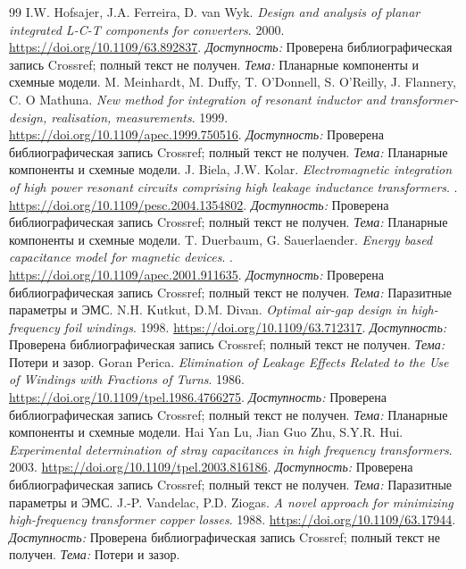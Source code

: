 \documentclass[14pt,a4paper]{extarticle}
\begin{document}
\begin{thebibliography}{99}
I.W. Hofsajer, J.A. Ferreira, D. van Wyk. \textit{Design and analysis of planar integrated L-C-T components for converters}. 2000.
\url{https://doi.org/10.1109/63.892837}.
\textit{Доступность:} Проверена библиографическая запись Crossref; полный текст не получен. \textit{Тема:} Планарные компоненты и схемные модели.
M. Meinhardt, M. Duffy, T. O'Donnell, S. O'Reilly, J. Flannery, C. O Mathuna. \textit{New method for integration of resonant inductor and transformer-design, realisation, measurements}. 1999.
\url{https://doi.org/10.1109/apec.1999.750516}.
\textit{Доступность:} Проверена библиографическая запись Crossref; полный текст не получен. \textit{Тема:} Планарные компоненты и схемные модели.
J. Biela, J.W. Kolar. \textit{Electromagnetic integration of high power resonant circuits comprising high leakage inductance transformers}. .
\url{https://doi.org/10.1109/pesc.2004.1354802}.
\textit{Доступность:} Проверена библиографическая запись Crossref; полный текст не получен. \textit{Тема:} Планарные компоненты и схемные модели.
T. Duerbaum, G. Sauerlaender. \textit{Energy based capacitance model for magnetic devices}. .
\url{https://doi.org/10.1109/apec.2001.911635}.
\textit{Доступность:} Проверена библиографическая запись Crossref; полный текст не получен. \textit{Тема:} Паразитные параметры и ЭМС.
N.H. Kutkut, D.M. Divan. \textit{Optimal air-gap design in high-frequency foil windings}. 1998.
\url{https://doi.org/10.1109/63.712317}.
\textit{Доступность:} Проверена библиографическая запись Crossref; полный текст не получен. \textit{Тема:} Потери и зазор.
Goran Perica. \textit{Elimination of Leakage Effects Related to the Use of Windings with Fractions of Turns}. 1986.
\url{https://doi.org/10.1109/tpel.1986.4766275}.
\textit{Доступность:} Проверена библиографическая запись Crossref; полный текст не получен. \textit{Тема:} Планарные компоненты и схемные модели.
Hai Yan Lu, Jian Guo Zhu, S.Y.R. Hui. \textit{Experimental determination of stray capacitances in high frequency transformers}. 2003.
\url{https://doi.org/10.1109/tpel.2003.816186}.
\textit{Доступность:} Проверена библиографическая запись Crossref; полный текст не получен. \textit{Тема:} Паразитные параметры и ЭМС.
J.-P. Vandelac, P.D. Ziogas. \textit{A novel approach for minimizing high-frequency transformer copper losses}. 1988.
\url{https://doi.org/10.1109/63.17944}.
\textit{Доступность:} Проверена библиографическая запись Crossref; полный текст не получен. \textit{Тема:} Потери и зазор.

\end{thebibliography}
\end{document}

